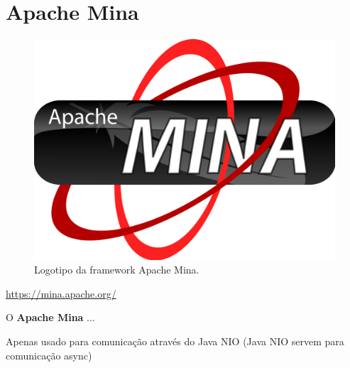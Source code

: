 \section{Apache Mina}
\label{subsec:mina}

\begin{figure}[H]
    \centering
    \includegraphics[scale=0.08]{images/mina.png}
    \caption{Logotipo da framework Apache Mina.}
    \label{fig:mina}
\end{figure}

\href{https://mina.apache.org/}{https://mina.apache.org/}

\hspace{5mm} O \textbf{Apache Mina} ...

Apenas usado para comunicação através do Java NIO (Java NIO servem para comunicação async)